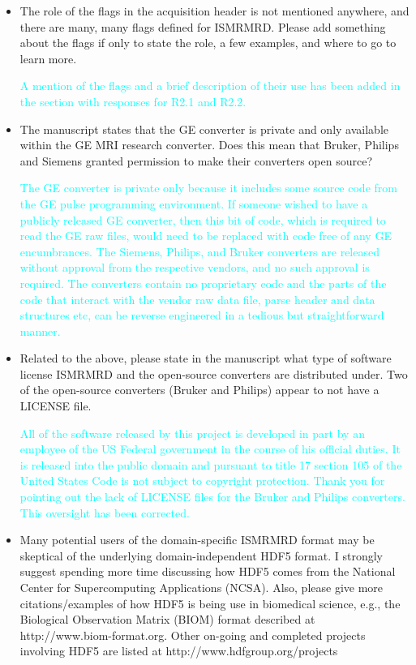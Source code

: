 \documentclass[12pt, draft]{article}
\makeatletter
\def\namedlabel#1#2{\begingroup#2\def\@currentlabel{#2}\phantomsection\label{#1}\endgroup}
\newcommand{\question}[1]{\item[\namedlabel{q#1}{#1}]}
\newcommand{\response}[1]{\textcolor{cyan}{#1}}
\makeatother
\begin{document}
{\begin{itemize}
\question{R2.7} The role of the flags in the acquisition header is not mentioned anywhere, and there are many, many flags defined for ISMRMRD. Please add something about the flags if only to state the role, a few examples, and where to go to learn more.

\response{A mention of the flags and a brief description of their use has been added in the section with responses for R2.1 and R2.2.}

\question{R2.8} The manuscript states that the GE converter is private and only available within the GE MRI research converter. Does this mean that Bruker, Philips and Siemens granted permission to make their converters open source?

\response{The GE converter is private only because it includes some source code from the GE pulse programming environment.  If someone wished to have a publicly released GE converter, then this bit of code, which is required to read the GE raw files, would need to be replaced with code free of any GE encumbrances.  The Siemens, Philips, and Bruker converters are released without approval from the respective vendors, and no such approval is required. The converters contain no proprietary code and the parts of the code that interact with the vendor raw data file, parse header and data structures etc, can be reverse engineered in a tedious but straightforward manner.}

\question{R2.9} Related to the above, please state in the manuscript what type of software license ISMRMRD and the open-source converters are distributed under. Two of the open-source converters (Bruker and Philips) appear to not have a LICENSE file.

\response{All of the software released by this project is developed in part by an employee of the US Federal government in the course of his official duties.  It is released into the public domain and pursuant to title 17 section 105 of the United States Code is not subject to copyright protection.  Thank you for pointing out the lack of LICENSE files for the Bruker and Philips converters.  This oversight has been corrected.}

\question{R2.10} Many potential users of the domain-specific ISMRMRD format may be skeptical of the underlying domain-independent HDF5 format. I strongly suggest spending more time discussing how HDF5 comes from the National Center for Supercomputing Applications (NCSA). Also, please give more citations/examples of how HDF5 is being use in biomedical science, e.g., the Biological Observation Matrix (BIOM) format described at http://www.biom-format.org. Other on-going and completed projects involving HDF5 are listed at http://www.hdfgroup.org/projects


\end{itemize}}
\end{document}
